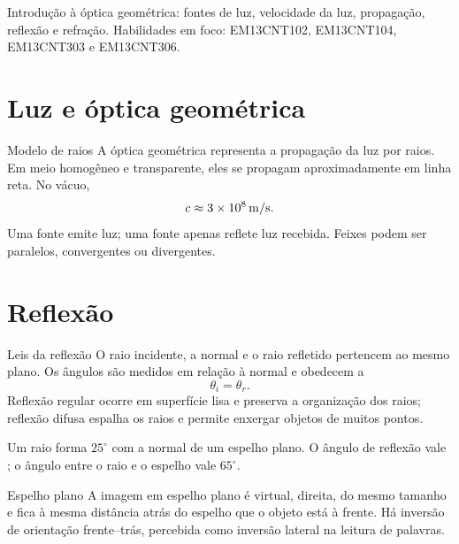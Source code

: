 \documentclass{notaaula}
\begin{document}
        \cabecalho

        \begin{sobre}
        Introdução à óptica geométrica: fontes de luz, velocidade da luz, propagação, reflexão e refração. Habilidades em foco: EM13CNT102, EM13CNT104, EM13CNT303 e EM13CNT306.
        \end{sobre}

        \section{Luz e óptica geométrica}

\begin{copiar}{Modelo de raios}
A óptica geométrica representa a propagação da luz por raios. Em meio homogêneo e transparente,
eles se propagam aproximadamente em linha reta. No vácuo,
\[
  c\approx3\times10^8\,\mathrm{m/s}.
\]
Uma fonte  emite luz; uma fonte  apenas reflete luz recebida.
Feixes podem ser paralelos, convergentes ou divergentes.
\end{copiar}

\section{Reflexão}

\begin{copiar}{Leis da reflexão}
O raio incidente, a normal e o raio refletido pertencem ao mesmo plano. Os ângulos são medidos
em relação à normal e obedecem a
\[
  \theta_i=\theta_r.
\]
Reflexão regular ocorre em superfície lisa e preserva a organização dos raios; reflexão difusa
espalha os raios e permite enxergar objetos de muitos pontos.
\end{copiar}

\begin{exemplo}
Um raio forma $25^\circ$ com a normal de um espelho plano. O ângulo de reflexão vale
; o ângulo entre o raio e o espelho vale $65^\circ$.
\end{exemplo}

\begin{copiar}{Espelho plano}
A imagem em espelho plano é virtual, direita, do mesmo tamanho e fica à mesma distância atrás
do espelho que o objeto está à frente. Há inversão de orientação frente--trás, percebida como
inversão lateral na leitura de palavras.
\end{copiar}
\end{document}
